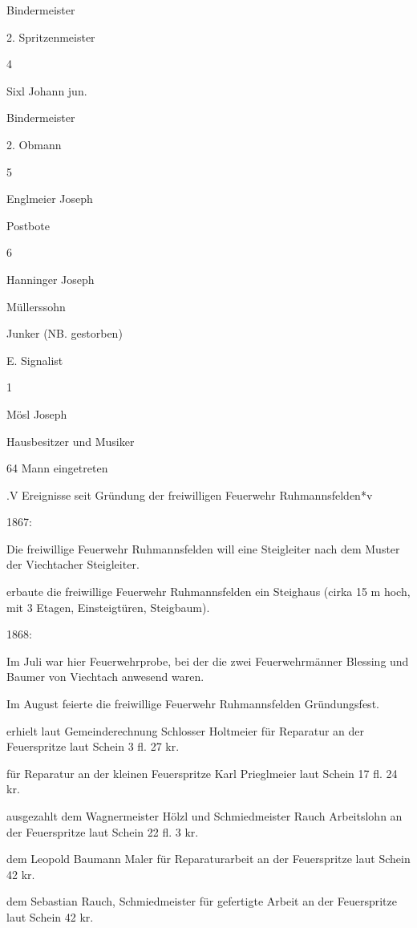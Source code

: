 \documentclass{book}
\begin{document}
Bindermeister

2. Spritzenmeister

4

Sixl Johann jun.

Bindermeister

2. Obmann

5

Englmeier Joseph

Postbote



6

Hanninger Joseph

Müllerssohn

Junker (NB. gestorben)



E. Signalist

1

Mösl Joseph

Hausbesitzer und Musiker





64 Mann eingetreten

.V Ereignisse seit Gründung der freiwilligen Feuerwehr Ruhmannsfelden*v

1867:

Die freiwillige Feuerwehr Ruhmannsfelden will eine Steigleiter nach dem Muster
der Viechtacher Steigleiter.

erbaute die freiwillige Feuerwehr Ruhmannsfelden ein Steighaus (cirka 15 m hoch,
mit 3 Etagen, Einsteigtüren, Steigbaum).

1868:

Im Juli war hier Feuerwehrprobe, bei der die zwei Feuerwehrmänner Blessing und
Baumer von Viechtach anwesend waren.

Im August feierte die freiwillige Feuerwehr Ruhmannsfelden Gründungsfest.

erhielt laut Gemeinderechnung Schlosser Holtmeier für Reparatur an der
Feuerspritze laut Schein 3 fl. 27 kr.

für Reparatur an der kleinen Feuerspritze Karl Prieglmeier laut Schein 17 fl. 24
kr.

ausgezahlt dem Wagnermeister Hölzl und Schmiedmeister Rauch Arbeitslohn an der
Feuerspritze laut Schein 22 fl. 3 kr.

dem Leopold Baumann Maler für Reparaturarbeit an der Feuerspritze laut Schein 42
kr.

dem Sebastian Rauch, Schmiedmeister für gefertigte Arbeit an der Feuerspritze
laut Schein 42 kr.
\end{document}
